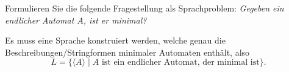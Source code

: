 Formulieren Sie die folgende Fragestellung als Sprachproblem:
{\em 
Gegeben ein endlicher Automat $A$, ist er minimal?
}

\begin{loesung}
Es muss eine Sprache konstruiert werden, welche genau die
Beschreibungen/Stringformen
minimaler Automaten enthält, also
\[
L
=
\{
\langle A\rangle
\mid
\text{$A$ ist ein endlicher Automat, der minimal ist}
\}.
\]
\end{loesung}
